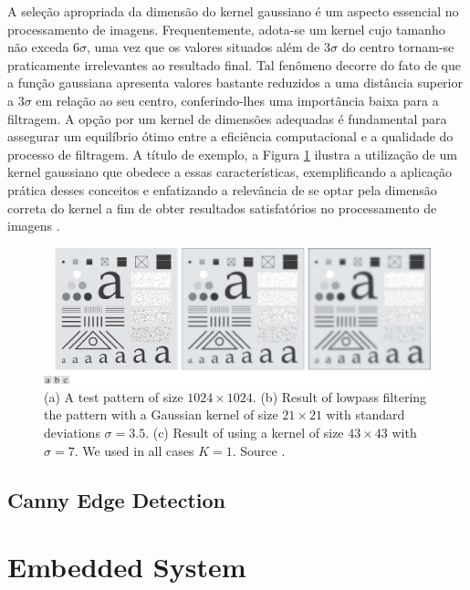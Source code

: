 A seleção apropriada da dimensão do kernel gaussiano é um aspecto essencial no processamento de imagens. Frequentemente, adota-se um kernel cujo tamanho não exceda $6\sigma$, uma vez que os valores situados além de $3\sigma$ do centro tornam-se praticamente irrelevantes ao resultado final. Tal fenômeno decorre do fato de que a função gaussiana apresenta valores bastante reduzidos a uma distância superior a $3\sigma$ em relação ao seu centro, conferindo-lhes uma importância baixa para a filtragem. A opção por um kernel de dimensões adequadas é fundamental para assegurar um equilíbrio ótimo entre a eficiência computacional e a qualidade do processo de filtragem. A título de exemplo, a Figura \ref{fig:gaussian-example} ilustra a utilização de um kernel gaussiano que obedece a essas características, exemplificando a aplicação prática desses conceitos e enfatizando a relevância de se optar pela dimensão correta do kernel a fim de obter resultados satisfatórios no processamento de imagens \cite{gonzalez_rafael_c_digital_2018}.

\begin{figure}[h!]
\centering
\includegraphics[width=.85\linewidth]{images/Development/chap3/gaussian_example.png}
\caption{(a) A test pattern of size $1024 \times 1024$. (b)  Result of lowpass filtering the pattern with a Gaussian kernel of size $21 \times 21$ with standard deviations  $ \sigma = 3.5 $. (c) Result of using a kernel of size $43 \times 43 $ with  $\sigma = 7 $. We
used in all cases $K = 1$. Source \cite{gonzalez_rafael_c_digital_2018}.}
\label{fig:gaussian-example}
\end{figure}


\subsection{Canny Edge Detection}\label{subsection:Canny-edge-detection}




\section{Embedded System}\label{embeddedSystem}

